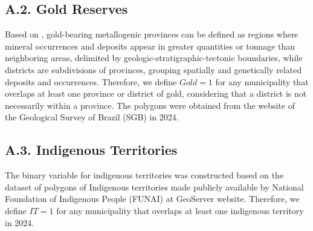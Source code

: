 \documentclass[preprint,12pt]{elsarticle}
\begin{document}
\subsection*{A.2. Gold Reserves}

Based on \citet{sgb2024}, gold-bearing metallogenic provinces can be defined as regions where mineral occurrences and deposits appear in greater quantities or tonnage than neighboring areas, delimited by geologic-stratigraphic-tectonic boundaries, while districts are subdivisions of provinces, grouping spatially and genetically related deposits and occurrences. Therefore, we define \(Gold = 1\) for any municipality that overlaps at least one province or district of gold, considering that a district is not necessarily within a province. The polygons were obtained from the website of the Geological Survey of Brazil (SGB) in 2024.

\subsection*{A.3. Indigenous Territories}

The binary variable for indigenous territories was constructed based on the dataset of polygons of Indigenous territories made publicly available by National Foundation of Indigenous People (FUNAI) at GeoServer website. Therefore, we define \(IT = 1\) for any municipality that overlaps at least one indigenous territory in 2024.
\end{document}

